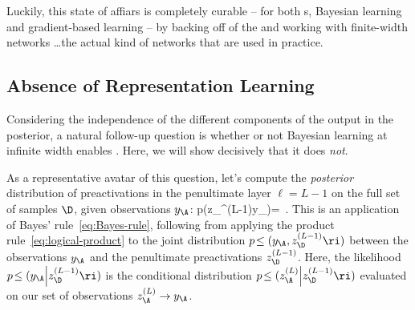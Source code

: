 Luckily, this state of affiars is completely curable --  for both s, Bayesian learning and gradient-based learning -- by backing off of the  and working with finite-width networks \ldots the actual kind of networks that are used in practice.







\subsection{Absence of Representation Learning}\label{subsec:absence-RL-Bayes}
Considering the independence of the different components of the output in the posterior, a natural follow-up question is whether or not Bayesian learning at infinite width enables . Here, we will show decisively that it does \emph{not}.

As a representative avatar of this question, let's compute the \emph{posterior} distribution of preactivations in the penultimate layer $\ell=L-1$ on the full set of samples $\D$, given observations $y_\A$:
\be\label{eq:Bayes-posterior-general}
p\!\le(z_{\D}^{(L-1)}\Big\vert y_\A \ri)=\, .
\ee
This is an application of Bayes' rule~\eqref{eq:Bayes-rule}, following from applying the product rule~\eqref{eq:logical-product} to the joint distribution $p\!\le(y_\A, z_{\D}^{(L-1)} \ri)$
between the observations $y_\A$ and the penultimate preactivations $z_{\D}^{(L-1)}$.
Here, the likelihood $p\!\le(y_\A \Big\vert z_{\D}^{(L-1)} \ri)$ is the conditional distribution $p\!\le(z_\A^{(L)} \Big\vert z_{\D}^{(L-1)} \ri)$ evaluated on our set of observations $z_{\A}^{(L)} \to y_\A$. 

